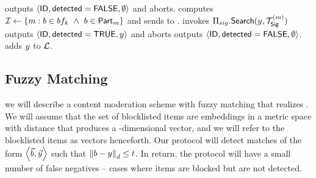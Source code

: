 \begin{algorithm}[t]
\begin{algorithmic}[1]
 
\State \server outputs $\langle \mathsf{ID}, \mathsf{detected} = \mathsf{FALSE}, \emptyset \rangle$ and aborts. 
\Else  {}
\State \server computes $\partitionIDSet \assign \{ \partitionIdx: \genericBlocklistElmt \in \bloomFilter[\bloomFilterIdx] ~\land ~\genericBlocklistElmt \in \partition{\partitionIdx}\}$ and sends to \client.  
\State \client invokes $\sigACB.\searchBlocklist(\genericCInputElmt,\sigBlklistToken{\partitionIdx})$
\State \server outputs $\langle \genericFileID, \detected = \tru, \genericCInputElmt \rangle$ and aborts
\Else
\State \server outputs $\langle \mathsf{ID}, \mathsf{detected} = \mathsf{FALSE}, \emptyset \rangle$. \client adds $\genericCInputElmt$ to $\mathcal{L}$. 
\EndIf
\EndFor
\EndIf


\end{algorithmic}
\end{algorithm}

\subsection{Fuzzy Matching}
%
we will describe a content moderation scheme with fuzzy matching that realizes \contentModFuncFuzzy. We will assume that the set of blocklisted items are embeddings in a metric space with distance \distance that produces a \genericVecLen-dimensional vector, and we will refer to 
the blocklisted items as vectors henceforth. 
Our protocol will detect matches of the form $\tupleDefn{\blocklistVec, \clientVec}$ such that 
$\distanceNotation[\distance][\genericBlocklistElmt][\genericCInputElmt] \le \threshold$. In return, the protocol will have a small number of false negatives -- cases where items are blocked but are not detected. 






